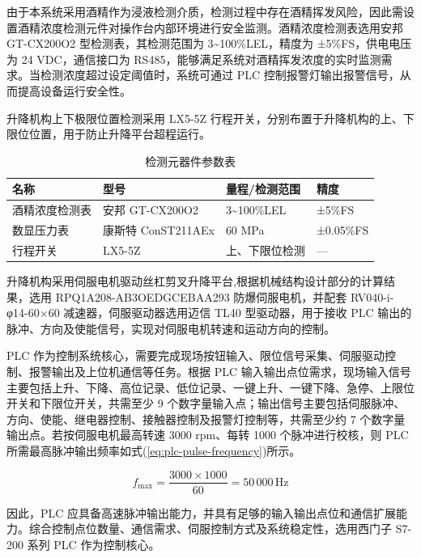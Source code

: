由于本系统采用酒精作为浸液检测介质，检测过程中存在酒精挥发风险，因此需设置酒精浓度检测元件对操作台内部环境进行安全监测。酒精浓度检测表选用安邦 GT-CX200O2 型检测表，其检测范围为 3\textasciitilde{}100\%LEL，精度为 ±5\%FS，供电电压为 24 VDC，通信接口为 RS485，能够满足系统对酒精挥发浓度的实时监测需求。当检测浓度超过设定阈值时，系统可通过 PLC 控制报警灯输出报警信号，从而提高设备运行安全性。

升降机构上下极限位置检测采用 LX5-5Z 行程开关，分别布置于升降机构的上、下限位位置，用于防止升降平台超程运行。

\begin{table}[htbp]
  \caption{检测元器件参数表}\label{tab:detection-components}
\vspace{0.5em}\centering\wuhao
\begin{tabular}{llll}
\toprule
名称 & 型号 & 量程/检测范围 & 精度 \\
\midrule
酒精浓度检测表 & 安邦 GT-CX200O2 & 3\textasciitilde{}100\%LEL & ±5\%FS \\
数显压力表 & 康斯特 ConST211AEx & 60 MPa & ±0.05\%FS \\
行程开关 & LX5-5Z & 上、下限位检测 & — \\
\bottomrule
\end{tabular}
\end{table}

升降机构采用伺服电机驱动丝杠剪叉升降平台,根据机械结构设计部分的计算结果，选用 RPQ1A208-AB3OEDGCEBAA293 防爆伺服电机，并配套 RV040-i-φ14-60×60 减速器，伺服驱动器选用迈信 TL40 型驱动器，用于接收 PLC 输出的脉冲、方向及使能信号，实现对伺服电机转速和运动方向的控制。

PLC 作为控制系统核心，需要完成现场按钮输入、限位信号采集、伺服驱动控制、报警输出及上位机通信等任务。根据 PLC 输入输出点位需求，现场输入信号主要包括上升、下降、高位记录、低位记录、一键上升、一键下降、急停、上限位开关和下限位开关，共需至少 9 个数字量输入点；输出信号主要包括伺服脉冲、方向、使能、继电器控制、接触器控制及报警灯控制等，共需至少约 7 个数字量输出点。若按伺服电机最高转速 3000 rpm、每转 1000 个脉冲进行校核，则 PLC 所需最高脉冲输出频率如式(\ref{eq:plc-pulse-frequency})所示。

\begin{equation}\label{eq:plc-pulse-frequency}
f_{\max}=\frac{3000\times1000}{60}=50\,000\,\mathrm{Hz}
\end{equation}

因此，PLC 应具备高速脉冲输出能力，并具有足够的输入输出点位和通信扩展能力。综合控制点位数量、通信需求、伺服控制方式及系统稳定性，选用西门子 S7-200 系列 PLC 作为控制核心。

